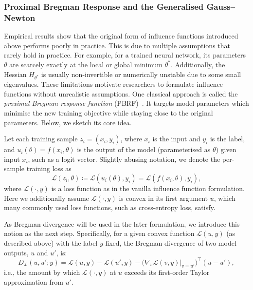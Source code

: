 \subsubsection{Proximal Bregman Response and the Generalised Gauss--Newton}

Empirical results show that the original form of influence functions introduced above performs poorly in practice. This is due to multiple assumptions that rarely hold in practice. For example, for a trained neural network, its parameters $\theta$ are scarcely exactly at the local or global minimum $\theta^*$. Additionally, the Hessian $H_{\theta^*}$ is usually non-invertible or numerically unstable due to some small eigenvalues. These limitations motivate researchers to formulate influence functions without unrealistic assumptions. One classical approach is called the \emph{proximal Bregman response function} (PBRF)~. It targets model parameters which minimise the new training objective while staying close to the original parameters. Below, we sketch its core idea.

Let each training sample $z_i=(x_i, y_i)$, where $x_i$ is the input and $y_i$ is the label, and $u_i(\theta) =f(x_i, \theta)$ is the output of the model (parameterised as $\theta$) given input $x_i$, such as a logit vector. Slightly abusing notation, we denote the per-sample training loss as
\[
\mathcal{L}(z_i, \theta) 
\coloneqq 
\mathcal{L}(u_i(\theta), y_i)
=
\mathcal{L}(f(x_i, \theta), y_i),
\]
where $\mathcal{L}(\cdot, y)$ is a loss function as in the vanilla influence function formulation. Here we additionally assume $\mathcal{L}(\cdot, y)$ is convex in its first argument $u$, which many commonly used loss functions, such as cross-entropy loss, satisfy.

As Bregman divergence will be used in the later formulation, we introduce this notion as the next step. Specifically, for a given convex function $\mathcal{L}(u, y)$ (as described above) with the label $y$ fixed, the Bregman divergence of two model outputs, $u$ and $u'$, is:
\[
D_{\mathcal{L}}(u, u'; y) = \mathcal{L}(u, y) - \mathcal{L}(u', y) - \big(\nabla_v \mathcal{L}(v, y)\big|_{v = u'}\big)^\top (u - u'),
\]
i.e., the amount by which $\mathcal{L}(\cdot, y)$ at $u$ exceeds its first-order Taylor approximation from $u'$.

